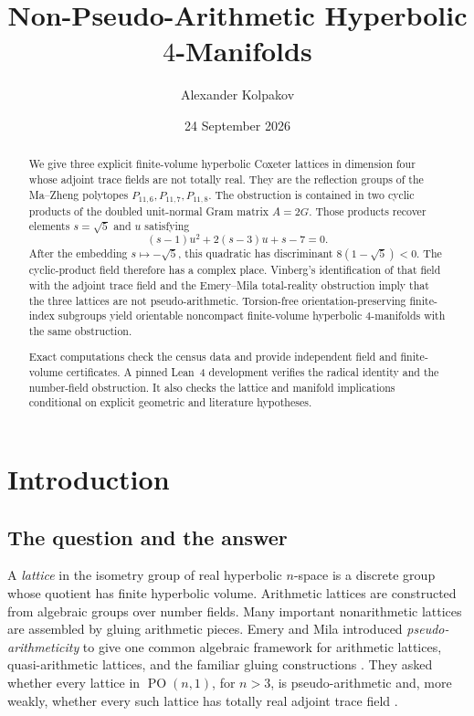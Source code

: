 \documentclass[11pt]{article}
\title{Non-Pseudo-Arithmetic Hyperbolic \(4\)-Manifolds}
\author{Alexander Kolpakov}
\date{24 September 2026}
\numberwithin{equation}{section}
\theoremstyle{definition}
\theoremstyle{remark}
\newcommand{\PO}{\operatorname{PO}}
\begin{document}
\maketitle

\begin{abstract}
We give three explicit finite-volume hyperbolic Coxeter lattices in dimension
four whose adjoint trace fields are not totally real.  They are the reflection
groups of the Ma--Zheng polytopes
\(P_{11,6},P_{11,7},P_{11,8}\).  The obstruction is contained in two cyclic
products of the doubled unit-normal Gram matrix \(A=2G\).  Those products
recover elements \(s=\sqrt5\) and \(u\) satisfying
\[
 (s-1)u^2+2(s-3)u+s-7=0.
\]
After the embedding \(s\mapsto-\sqrt5\), this quadratic has discriminant
\(8(1-\sqrt5)<0\).  The cyclic-product field therefore has a complex place.
Vinberg's identification of that field with the adjoint trace field and the
Emery--Mila total-reality obstruction imply that the three lattices are not
pseudo-arithmetic.  Torsion-free orientation-preserving finite-index
subgroups yield orientable noncompact finite-volume hyperbolic
\(4\)-manifolds with the same obstruction.

Exact computations check the census data and provide independent field and
finite-volume certificates.  A pinned Lean~4 development verifies the
radical identity and the number-field obstruction.  It also checks the
lattice and manifold implications conditional on explicit geometric and
literature hypotheses.
\end{abstract}

\tableofcontents

\section{Introduction}
\label{sec:introduction}

\subsection{The question and the answer}

A \emph{lattice} in the isometry group of real hyperbolic \(n\)-space is a
discrete group whose quotient has finite hyperbolic volume.  Arithmetic
lattices are constructed from algebraic groups over number fields.  Many
important nonarithmetic lattices are assembled by gluing arithmetic pieces.
Emery and Mila introduced \emph{pseudo-arithmeticity} to give one common
algebraic framework for arithmetic lattices, quasi-arithmetic lattices, and
the familiar gluing constructions \cite{EmeryMila}.  They asked whether every
lattice in \(\PO(n,1)\), for \(n>3\), is pseudo-arithmetic and, more weakly,
whether every such lattice has totally real adjoint trace field
\cite[Questions~1.8 and~1.10]{EmeryMila}.
\end{document}
